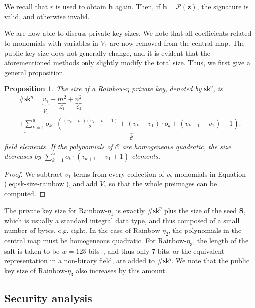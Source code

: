\documentclass[12pt, a4paper, oneside]{memoir}
\newtheorem{proposition}[theorem]{Proposition}
\theoremstyle{definition}
\begin{document}
We recall that $r$ is used to obtain $\mathbf{h}$ again. Then, if $\mathbf{h} = \mathcal{P}(\mathbf{z})$, the signature is valid, and otherwise invalid.

We are now able to discuss private key sizes. We note that all coefficients related to monomials with variables in $\widetilde{V}_{1}$ are now removed from the central map. The public key size does not generally change, and it is evident that the aforementioned methods only slightly modify the total size. Thus, we first give a general proposition.

\begin{proposition}\label{prop:eta-key-size}
  The size of a Rainbow-$\eta$ private key, denoted by $\mathsf{sk}^{\eta}$, is
  \begin{multline}
    \#\mathsf{sk}^{\eta} = \underbrace{v_{1}}_{\widetilde{V}_{1}}
      + \underbrace{m^{2}}_{\mathcal{L}_{1}}
      + \underbrace{n^{2}}_{\mathcal{L}_{2}} \\
      + \underbrace{\sum_{k = 1}^{u} o_{k} \cdot \left( \frac{(v_{k} - v_{1})(v_{k} - v_{1} + 1)}{2}
        + (v_{k} - v_{1}) \cdot o_{k} + (v_{k + 1} - v_{1}) + 1 \right)}_{\overline{\mathcal{C}}}.
  \end{multline}
  field elements. If the polynomials of $\overline{\mathcal{C}}$ are homogeneous quadratic, the size decreases by $\sum_{k = 1}^{u} o_{k} \cdot (v_{k + 1} - v_{1} + 1)$ elements.
\end{proposition}
\begin{proof}
  We subtract $v_{1}$ terms from every collection of $v_{k}$ monomials in Equation (\ref{eq:sk-size-rainbow}), and add $\widetilde{V}_{1}$ so that the whole preimages can be computed.
\end{proof}

The private key size for Rainbow-$\eta_{1}$ is exactly $\#\mathsf{sk}^{\eta}$ plus the size of the seed $\mathbf{S}$, which is usually a standard integral data type, and thus composed of a small number of bytes, e.g. eight. In the case of Rainbow-$\eta_{2}$, the polynomials in the central map must be homogeneous quadratic. For Rainbow-$\eta_{3}$, the length of the salt is taken to be $w = 128$ bits~\cite[p.~11]{Ding:201901}, and thus only $7$ bits, or the equivalent representation in a non-binary field, are added to $\#\mathsf{sk}^{\eta}$. We note that the public key size of Rainbow-$\eta_{3}$ also increases by this amount.

\subsection{Security analysis}\label{subsec:analysis}
\end{document}
